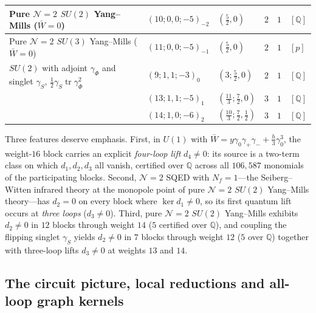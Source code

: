 \documentclass[11pt]{article}
\numberwithin{equation}{section}
\numberwithin{figure}{section}
\numberwithin{table}{section}
\begin{document}
{\begin{xltabular}{\linewidth}{|>{\raggedright\arraybackslash}X|l|l|c|c|l|}
\hline
Pure $\mathcal N=2$ $SU(2)$ Yang--Mills ($\bar W=0$) & $(10;0,0;-5)_{-2}$ & $(\tfrac52,0)$ & $2$ & $1$ & $[\mathbb Q]$\\
\hline
Pure $\mathcal N=2$ $SU(3)$ Yang--Mills ($\bar W=0$) & $(11;0,0;-5)_{-1}$ & $(\tfrac52,0)$ & $2$ & $1$ & $[p]$\\
\hline
$SU(2)$ with adjoint $\gamma_\Phi$ and singlet $\gamma_S$, $\tfrac12\gamma_S\operatorname{tr}\gamma_\Phi^2$ & $(9;1,1;-3)_0$ & $(3;\tfrac52,0)$ & $2$ & $1$ & $[\mathbb Q]$\\
 & $(13;1,1;-5)_1$ & $(\tfrac{11}3;\tfrac72,0)$ & $3$ & $1$ & $[\mathbb Q]$\\
 & $(14;1,0;-6)_2$ & $(\tfrac{10}3;\tfrac72,\tfrac12)$ & $3$ & $1$ & $[\mathbb Q]$\\
\hline
\end{xltabular}}

Three features deserve emphasis. First, in $U(1)$ with $\bar W=y\gamma_0\gamma_+\gamma_-+\tfrac h3\gamma_0^3$, the weight-$16$ block carries an explicit \emph{four-loop lift} $d_4\ne0$: its source is a two-term class on which $d_1,d_2,d_3$ all vanish, certified over $\mathbb Q$ across all $106{,}587$ monomials of the participating blocks. Second, $\mathcal N=2$ SQED with $N_f=1$---the Seiberg--Witten infrared theory at the monopole point of pure $\mathcal N=2$ $SU(2)$ Yang--Mills theory---has $d_2=0$ on every block where $\ker d_1\ne0$, so its first quantum lift occurs at \emph{three loops} ($d_3\ne0$). Third, pure $\mathcal N=2$ $SU(2)$ Yang--Mills exhibits $d_2\ne0$ in $12$ blocks through weight $14$ ($5$ certified over $\mathbb Q$), and coupling the flipping singlet $\gamma_S$ yields $d_2\ne0$ in $7$ blocks through weight $12$ ($5$ over $\mathbb Q$) together with three-loop lifts $d_3\ne0$ at weights $13$ and $14$.

\subsection{The circuit picture, local reductions and all-loop graph kernels}\label{sec-sum-circuit}
\end{document}
